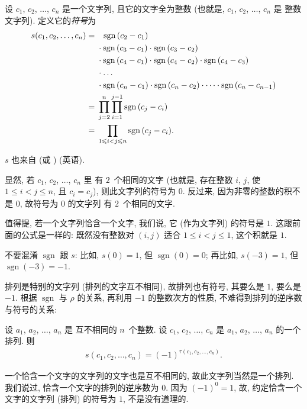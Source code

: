 \documentclass[../libro.tex]{subfiles}
\begin{document}
\begin{definition}[整数文字列的符号]
    设 \(c_1\), \(c_2\), \(\dots\), \(c_n\) 是一个文字列,
    且它的文字全为整数
    (也就是, \(c_1\), \(c_2\), \(\dots\), \(c_n\) 是%
    整数文字列).
    定义它的\emph{符号}为
    \begin{align*}
        s(c_1, c_2, \dots, c_n)
        = {} & \hphantom{\cdot\,\,}
        \operatorname{sgn} {(c_2 - c_1)}
        \\
        & \cdot \operatorname{sgn} {(c_3 - c_1)}
        \cdot \operatorname{sgn} {(c_3 - c_2)}
        \\
        & \cdot \operatorname{sgn} {(c_4 - c_1)}
        \cdot \operatorname{sgn} {(c_4 - c_2)}
        \cdot \operatorname{sgn} {(c_4 - c_3)}
        \\
        & \cdot
        \dots
        \\
        & \cdot \operatorname{sgn} {(c_n - c_1)}
        \cdot \operatorname{sgn} {(c_n - c_2)} \cdot \dots
        \cdot \operatorname{sgn} {(c_n - c_{n-1})}
        \\
        = {} & \prod_{j = 2}^{n} {
        \prod_{i = 1}^{j - 1} {\operatorname{sgn} {(c_j - c_i)}} }
        \\
        = {} & \prod_{1 \leq i < j \leq n}
        {\operatorname{sgn} {(c_j - c_i)}}.
    \end{align*}
\end{definition}

\(s\) 也来自
 (或 ) (英语).

显然, 若 \(c_1\), \(c_2\), \(\dots\), \(c_n\) 里%
有 \(2\)~个相同的文字
(也就是, 存在整数 \(i\), \(j\),
使 \(1 \leq i < j \leq n\), %
且 \(c_i = c_j\)),
则此文字列的符号为 \(0\).
反过来, 因为非零的整数的积不是 \(0\),
故符号为 \(0\) 的文字列%
有 \(2\)~个相同的文字.

值得提,
若一个文字列恰含一个文字,
我们说, 它 (作为文字列) 的符号是 \(1\).
这跟前面的公式是一样的:
既然没有整数对 \((i, j)\) 适合 \(1 \leq i < j \leq 1\),
这个积就是 \(1\).

不要混淆 \(\operatorname{sgn}\) 跟 \(s\):
比如, \(s(0) = 1\), 但 \(\operatorname{sgn} {(0)} = 0\);
再比如, \(s(-3) = 1\), 但 \(\operatorname{sgn} {(-3)} = -1\).

排列是特别的文字列
(排列的文字互不相同),
故排列也有符号,
其要么是 \(1\), 要么是 \(-1\).
根据 \(\operatorname{sgn}\) 与 \(\rho\) 的关系,
再利用 \(-1\) 的整数次方的性质,
不难得到排列的逆序数与符号的关系:

\begin{theorem}
    设 \(a_1\), \(a_2\), \(\dots\), \(a_n\) 是%
    互不相同的 \(n\)~个整数.
    设
    \(c_1\), \(c_2\), \(\dots\), \(c_n\)
    是 \(a_1\), \(a_2\), \(\dots\), \(a_n\) 的一个排列.
    则
    \begin{align*}
        s(c_1, c_2, \dots, c_n)
        = (-1)^{\tau(c_1, c_2, \dots, c_n)}.
    \end{align*}
\end{theorem}

一个恰含一个文字的文字列的文字也是互不相同的,
故此文字列当然是一个排列.
我们说过, 恰含一个文字的排列的逆序数为 \(0\).
因为 \((-1)^0 = 1\),
故, 约定恰含一个文字的文字列 (排列) 的符号为 \(1\),
不是没有道理的.
\end{document}
